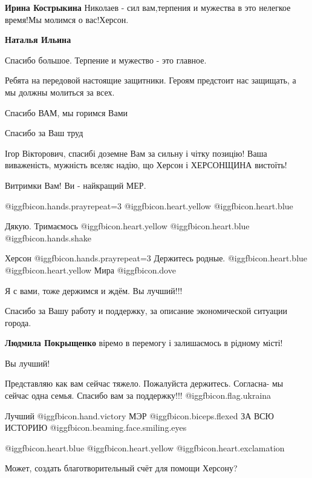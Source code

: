 \begin{itemize}
\textbf{Ирина Кострыкина} Николаев - сил вам,терпения и мужества в это нелегкое время!Мы молимся о вас!Херсон.

\textbf{Наталья Ильина} 

Спасибо большое. Терпение и мужество - это главное.

Ребята на передовой настоящие защитники. Героям предстоит нас защищать, а мы
должны молиться за всех.

Спасибо ВАМ, мы горимся Вами

Спасибо за Ваш труд


Ігор Вікторович, спасибі доземне Вам за сильну і чітку позицію! Ваша
виваженість, мужність вселяє надію, що Херсон і ХЕРСОНЩИНА вистоїть!

Витримки Вам! Ви - найкращий МЕР.

 @igg{fbicon.hands.pray}{repeat=3}  @igg{fbicon.heart.yellow}  @igg{fbicon.heart.blue} 

Дякую. Тримаємось @igg{fbicon.heart.yellow}  @igg{fbicon.heart.blue}  @igg{fbicon.hands.shake} 

Херсон @igg{fbicon.hands.pray}{repeat=3} Держитесь родные.  @igg{fbicon.heart.blue}  @igg{fbicon.heart.yellow}  Мира  @igg{fbicon.dove} 

Я с вами, тоже держимся и ждём. Вы лучший!!!

Спасибо за Вашу работу и поддержку, за описание экономической ситуации города.

\textbf{Людмила Покрыщенко} віремо в перемогу і залишаємось в рідному місті!

Вы лучший!


Представляю как вам сейчас тяжело. Пожалуйста держитесь. Согласна- мы сейчас
одна семья. Спасибо вам за поддержку!!! @igg{fbicon.flag.ukraina}

Лучший @igg{fbicon.hand.victory} МЭР  @igg{fbicon.biceps.flexed}  ЗА ВСЮ
ИСТОРИЮ  @igg{fbicon.beaming.face.smiling.eyes} 


 @igg{fbicon.heart.blue}  @igg{fbicon.heart.yellow}  @igg{fbicon.heart.exclamation}

Может, создать благотворительный счёт для помощи Херсону?


\end{itemize}
